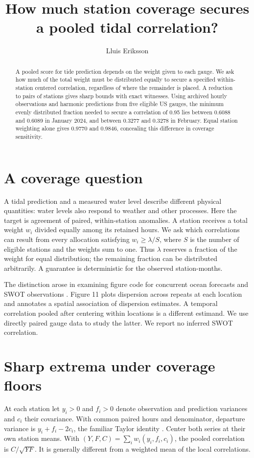 \documentclass[11pt]{article}
\title{How much station coverage secures a pooled tidal correlation?}
\author{Lluis Eriksson}
\date{}
\begin{document}
\maketitle
\begin{abstract}
A pooled score for tide prediction depends on the weight given to each gauge. We ask how much of the total weight must be distributed equally to secure a specified within-station centered correlation, regardless of where the remainder is placed. A reduction to pairs of stations gives sharp bounds with exact witnesses. Using archived hourly observations and harmonic predictions from five eligible US gauges, the minimum evenly distributed fraction needed to secure a correlation of 0.95 lies between 0.6088 and 0.6089 in January 2024, and between 0.3277 and 0.3278 in February. Equal station weighting alone gives 0.9770 and 0.9846, concealing this difference in coverage sensitivity.
\end{abstract}

\section{A coverage question}
A tidal prediction and a measured water level describe different physical quantities: water levels also respond to weather and other processes. Here the target is agreement of paired, within-station anomalies. A station receives a total weight $w_i$ divided equally among its retained hours. We ask which correlations can result from every allocation satisfying $w_i\ge\lambda/S$, where $S$ is the number of eligible stations and the weights sum to one. Thus $\lambda$ reserves a fraction of the weight for equal distribution; the remaining fraction can be distributed arbitrarily. A guarantee is deterministic for the observed station-months.

The distinction arose in examining figure code for concurrent ocean forecasts and SWOT observations \cite{eddies}. Figure 11 plots dispersion across repeats at each location and annotates a spatial association of dispersion estimates. A temporal correlation pooled after centering within locations is a different estimand. We use directly paired gauge data to study the latter. We report no inferred SWOT correlation.

\section{Sharp extrema under coverage floors}
At each station let $y_i>0$ and $f_i>0$ denote observation and prediction variances and $c_i$ their covariance. With common paired hours and denominator, departure variance is $y_i+f_i-2c_i$, the familiar Taylor identity \cite{taylor}. Center both series at their own station means. With $(Y,F,C)=\sum_i w_i(y_i,f_i,c_i)$, the pooled correlation is $C/\sqrt{YF}$. It is generally different from a weighted mean of the local correlations.
\end{document}
